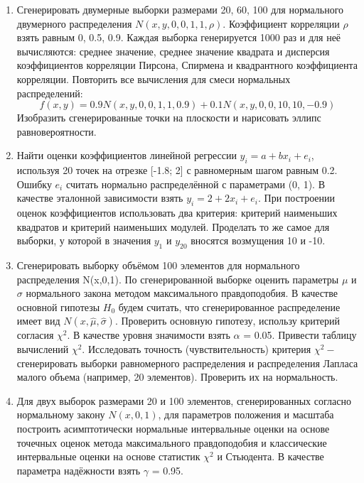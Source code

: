 \documentclass[../main.tex]{subfiles}
\begin{document}
    \begin{enumerate}
        \item \noindent Сгенерировать двумерные выборки размерами 20, 60, 100 для нормального двумерного распределения $N(x,y,0,0,1,1,\rho)$.
        \newline Коэффициент корреляции $\rho$ взять равным 0, 0.5, 0.9.
        \newline Каждая выборка генерируется 1000 раз и для неё вычисляются: среднее значение, среднее значение квадрата и дисперсия коэффициентов корреляции Пирсона, Спирмена и квадрантного коэффициента корреляции. 
        \newline Повторить все вычисления для смеси нормальных распределений:
        \begin{equation}
	        f(x,y) = 0.9N(x,y,0,0,1,1,0.9) + 0.1N(x,y,0,0,10,10,-0.9)
        \end{equation}
        \newline Изобразить сгенерированные точки на плоскости и нарисовать эллипс равновероятности.
        
        \item \noindent Найти оценки коэффициентов линейной регрессии $y_{i} = a + bx_{i} + e_{i}$, используя 20 точек на отрезке [-1.8; 2] с равномерным шагом равным 0.2. Ошибку $e_{i}$ считать нормально распределённой с параметрами (0, 1). В качестве эталонной зависимости взять $y_{i} = 2 + 2x_{i} + e_{i}$. При построении оценок коэффициентов использовать два критерия: критерий наименьших квадратов и критерий наименьших модулей. Проделать то же самое для выборки, у которой в значения $y_{1}$ и $y_{20}$ вносятся возмущения 10 и -10. 

        \item \noindent Сгенерировать выборку объёмом 100 элементов для нормального распределения N(x,0,1). По сгенерированной выборке оценить параметры $\mu$ и $\sigma$ нормального закона методом максимального правдоподобия. В качестве основной гипотезы $H_{0}$ будем считать, что сгенерированное распределение имеет вид $N(x,\hat{\mu}, \hat{\sigma})$. Проверить основную гипотезу, использу критерий согласия $\chi^{2}$. В качестве уровня значимости взять $\alpha$ = 0.05. Привести таблицу вычислений $\chi^{2}$. 
        \newline Исследовать точность (чувствительность) критерия $\chi^{2} - $ сгенерировать выборки равномерного распределения и распределения Лапласа малого объема (например, 20 элементов). Проверить их на нормальность.
        
        \item \noindent Для двух выборок размерами 20 и 100 элементов, сгенерированных согласно нормальному закону $N(x,0,1)$, для параметров положения и масштаба построить асимптотически нормальные интервальные оценки на основе точечных оценок метода максимального правдоподобия и классические интервальные оценки на основе статистик $\chi^{2}$ и Стьюдента. В качестве параметра надёжности взять $\gamma$ = 0.95.

    \end{enumerate}
\end{document}
